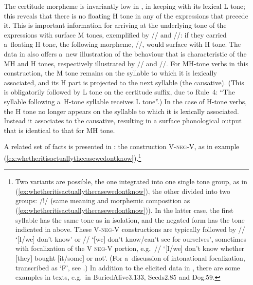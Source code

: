 The {certitude} morpheme is invariantly low in , in keeping with its lexical L tone; this reveals that there is no floating H tone in any of the expressions that precede it. This is important information for arriving at the underlying tone of the expressions with surface M tones, exemplified by // and
//: if they carried a~floating H tone, the following morpheme, //, would surface with H
tone. The data in  also offers a~new illustration of the behaviour that is characteristic of the MH and H tones, respectively illustrated by
// and //. For MH-tone verbs in this construction, the M tone remains on the syllable to which it is lexically associated, and its H part is projected to the next syllable (the {causative}). (This is obligatorily followed by L tone on the {certitude} suffix, due to Rule~4: “The syllable following a~H-tone syllable receives L tone”.) In the case of H-tone verbs, the H tone no longer appears on the syllable to which it is lexically associated. Instead it associates to the {causative}, resulting in a surface phonological output that is identical to that for MH tone.

\largerpage
A related set of facts is presented in : the construction V-\textsc{neg}-V, as in example (\ref{ex:whetheritisactuallythecasewedontknow}).\footnote{Two variants are possible, the one integrated into one single {tone group}, as in
	(\ref{ex:whetheritisactuallythecasewedontknow}), the other divided into two groups: /!/ (same meaning and morphemic composition as (\ref{ex:whetheritisactuallythecasewedontknow})). In the latter case,
	the first syllable has the same tone as in isolation, and the negated form has the tone indicated in
	 above. These V-\textsc{neg}-V constructions are typically followed by //
	‘[I/we] don’t know’ or // ‘[we] don’t know/can’t see for ourselves’, sometimes with
	{focalization} of the V \textsc{neg}-V portion, e.g.~// ‘[I/we] don’t know whether [they] bought [it/some] or not’. (For a~discussion of intonational {focalization}, transcribed as ‘F’, see .) In addition to the elicited data in , there are some examples in texts, e.g.~in
	BuriedAlive3.133, Seeds2.85 and Dog.59.}


